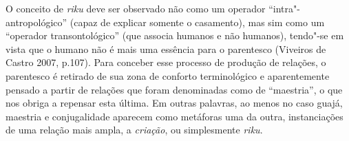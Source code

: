 O conceito de \emph{riku} deve ser observado não como um operador
``intra"-antropológico'' (capaz de explicar somente o casamento), mas sim
como um ``operador transontológico'' (que associa humanos e não humanos),
tendo"-se em vista que o humano não é mais uma essência para o parentesco
(Viveiros de Castro 2007, p.107). Para conceber esse processo de
produção de relações, o parentesco é retirado de sua zona de conforto
terminológico e aparentemente pensado a partir de relações que foram
denominadas como de ``maestria'', o que nos obriga a repensar esta última.
Em outras palavras, ao menos no caso guajá, maestria e conjugalidade
aparecem como metáforas uma da outra, instanciações de uma relação mais
ampla, a \emph{criação}, ou simplesmente \emph{riku}.
